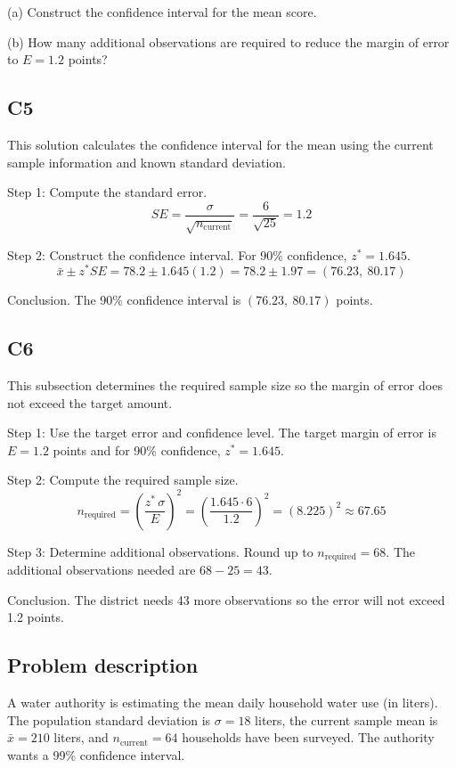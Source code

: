 \begin{ExamProblems}
		(a) Construct the confidence interval for the mean score.
		
		(b) How many additional observations are required to reduce the margin of error to $E = 1.2$ points?
		
		\subsection*{C5}
		This solution calculates the confidence interval for the mean using the current sample information and known standard deviation.
		
		Step 1: Compute the standard error.
		\[
		SE = \frac{\sigma}{\sqrt{n_{\text{current}}}}
		= \frac{6}{\sqrt{25}}
		= 1.2
		\]
		
		Step 2: Construct the confidence interval. For 90\% confidence, $z^* = 1.645$.
		\[
		\bar{x} \pm z^* SE = 78.2 \pm 1.645(1.2)
		= 78.2 \pm 1.97
		= (76.23,\ 80.17)
		\]
		
		Conclusion. The 90\% confidence interval is $(76.23,\ 80.17)$ points.
		
		\subsection*{C6}
		This subsection determines the required sample size so the margin of error does not exceed the target amount.
		
		Step 1: Use the target error and confidence level. The target margin of error is $E = 1.2$ points and for 90\% confidence, $z^* = 1.645$.
		
		Step 2: Compute the required sample size.
		\[
		n_{\text{required}} = \left(\frac{z^*\,\sigma}{E}\right)^2
		= \left(\frac{1.645 \cdot 6}{1.2}\right)^2
		= \left(8.225\right)^2
		\approx 67.65
		\]
		
		Step 3: Determine additional observations. Round up to $n_{\text{required}} = 68$. The additional observations needed are $68 - 25 = 43$.
		
		Conclusion. The district needs 43 more observations so the error will not exceed 1.2 points.
		
		\item
		\subsection*{Problem description}
		A water authority is estimating the mean daily household water use (in liters). The population standard deviation is $\sigma = 18$ liters, the current sample mean is $\bar{x} = 210$ liters, and $n_{\text{current}} = 64$ households have been surveyed. The authority wants a 99\% confidence interval.
		

\end{ExamProblems}
